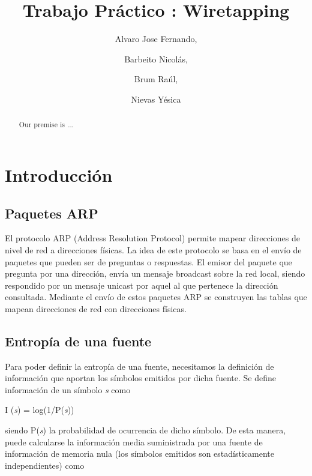 \documentclass[final,inline,narroweqnarray,a4paper]{ieee}
\begin{document}
\title[TP1: Wiretapping]{%
Trabajo Práctico : Wiretapping}

\author[Alvaro, Barbeito, Brum, Nievas]{%
	Alvaro Jose Fernando, 
	\and
	Barbeito Nicolás,
	\and
	Brum Raúl,
	\and
	Nievas Yésica
}

\maketitle

\begin{abstract}
Our premise is ...
\end{abstract}

\section{Introducción}

\subsection{Paquetes ARP}
El protocolo ARP (Address Resolution Protocol) permite mapear direcciones de nivel de red a direcciones físicas. La idea de este protocolo se basa en el envío de paquetes que pueden ser de preguntas o respuestas. El emisor del paquete que pregunta por una dirección, envía un mensaje broadcast sobre la red local, siendo respondido por un mensaje unicast por aquel al que pertenece la dirección consultada. Mediante el envío de estos paquetes ARP se construyen las tablas que mapean direcciones de red con direcciones físicas.

\subsection{Entropía de una fuente}
Para poder definir la entropía de una fuente, necesitamos la definición de información que aportan los símbolos emitidos por dicha fuente. Se define información de un símbolo \textit{s} como 
\begin{center}
	I (\textit{s}) = log(1/P(\textit{s})) 
\end{center}
siendo P(\textit{s}) la probabilidad de ocurrencia de dicho símbolo.
De esta manera, puede calcularse la información media suministrada por una fuente de información de memoria nula (los símbolos emitidos son estadísticamente independientes) como 
\end{document}
